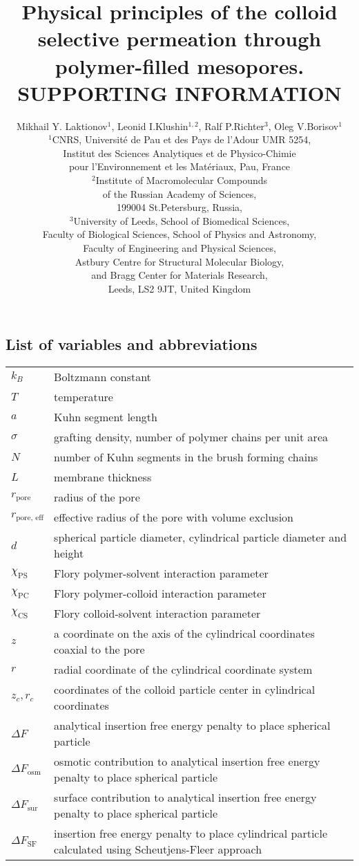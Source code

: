 \documentclass[10pt, a4paper]{article}
\title{Physical principles of the colloid selective permeation through polymer-filled mesopores.\\
        SUPPORTING INFORMATION}
\author{Mikhail Y. Laktionov$^1$, Leonid I.Klushin$^{1,2}$, Ralf P.Richter$^3$, Oleg V.Borisov$^1$\\
$^{1}$CNRS, Universit\'e de Pau et des Pays de l'Adour UMR 5254,\\
Institut des Sciences Analytiques et de Physico-Chimie\\
pour l'Environnement et les Mat\'eriaux, Pau, France \\
$^{2}$Institute of Macromolecular Compounds \\
of the Russian Academy of Sciences, \\
199004 St.Petersburg, Russia,\\
$^{3}$University of Leeds, School of Biomedical Sciences, \\
Faculty of Biological Sciences, 
School of Physics and Astronomy, \\
Faculty of Engineering and Physical Sciences,\\  
Astbury Centre for Structural Molecular Biology,\\ 
and Bragg Center for Materials Research,\\ 
Leeds, LS2 9JT, United Kingdom}
\begin{document}
\maketitle

\subsection*{List of variables and abbreviations}

\begin{tabularx}{\linewidth}{l l}
$k_B$ & Boltzmann constant \\
$T$ & temperature \\
$a$ & Kuhn segment length \\
$\sigma$ & grafting density, number of polymer chains per unit area \\
$N$ & number of Kuhn segments in the brush forming chains \\
$L$ & membrane thickness \\
$r_{\textrm{pore}}$ & radius of the pore \\
$r_{\textrm{pore, eff}}$ & effective radius of the pore with volume exclusion \\
$d$ & spherical particle diameter, cylindrical particle diameter and height \\ 
$\chi_{\textrm{PS}}$ & Flory polymer-solvent interaction parameter  \\
$\chi_{\textrm{PC}}$ & Flory polymer-colloid interaction parameter  \\
$\chi_{\textrm{CS}}$ & Flory colloid-solvent interaction parameter  \\
$z$ & a coordinate on the axis of the cylindrical coordinates coaxial to the pore \\
$r$ & radial coordinate of the cylindrical coordinate system \\
$z_{c}, r_{c}$ & coordinates of the colloid particle center in cylindrical coordinates \\
$\Delta F$ & analytical insertion free energy penalty to place spherical particle \\
$\Delta F_{\textrm{osm}}$ & osmotic contribution to analytical insertion free energy penalty to place spherical particle \\
$\Delta F_{\textrm{sur}}$ & surface contribution to analytical insertion free energy penalty to place spherical particle \\
$\Delta F_{\textrm{SF}}$ & insertion free energy penalty to place cylindrical particle calculated using Scheutjens-Fleer approach \\

\end{tabularx}
\end{document}
